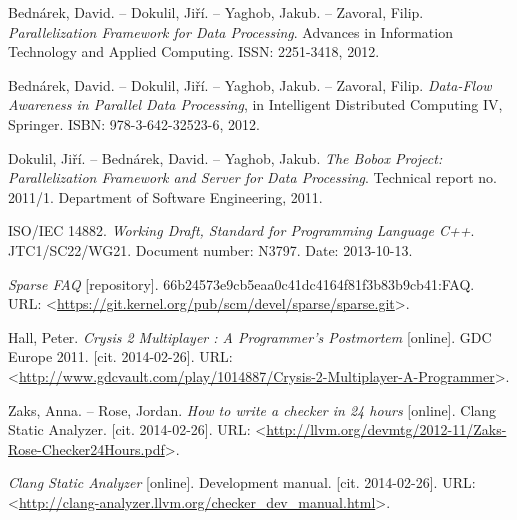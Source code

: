 
\def\bibname{Bibliography}
\begin{thebibliography}{99}
\addcontentsline{toc}{chapter}{\bibname}


	{\sc Bednárek}, David. -- {\sc Dokulil}, Jiří. -- {\sc Yaghob}, Jakub. -- {\sc Zavoral}, Filip.
	\emph{Parallelization Framework for Data Processing}.
	Advances in Information Technology and Applied Computing.
	ISSN: 2251-3418, 2012.
	
	{\sc Bednárek}, David. -- {\sc Dokulil}, Jiří. -- {\sc Yaghob}, Jakub. -- {\sc Zavoral}, Filip.
	\emph{Data-Flow Awareness in Parallel Data Processing},
	in Intelligent Distributed Computing IV, Springer.
	ISBN: 978-3-642-32523-6, 2012.

	{\sc Dokulil}, Jiří. -- {\sc Bednárek}, David. -- {\sc Yaghob}, Jakub.
	\emph{The Bobox Project: Parallelization Framework and Server for Data Processing}.
	Technical report no. 2011/1.
	Department of Software Engineering, 2011.
	
	ISO/IEC 14882.
	\emph{Working Draft, Standard for Programming Language C++}.
	JTC1/SC22/WG21.
	Document number: N3797.
	Date: 2013-10-13.
	
	\emph{Sparse FAQ} [repository].
	66b24573e9cb5eaa0c41dc4164f81f3b83b9cb41:FAQ.
	URL: <\url{https://git.kernel.org/pub/scm/devel/sparse/sparse.git}>.
	
	{\sc Hall}, Peter.
	\emph{Crysis 2 Multiplayer : A Programmer's Postmortem} [online].
	GDC Europe 2011.
	[cit. 2014-02-26].
	URL: <\url{http://www.gdcvault.com/play/1014887/Crysis-2-Multiplayer-A-Programmer}>.
	
	{\sc Zaks}, Anna. -- {\sc Rose}, Jordan.
	\emph{How to write a checker in 24 hours} [online].
	Clang Static Analyzer.
	[cit. 2014-02-26].
	URL: <\url{http://llvm.org/devmtg/2012-11/Zaks-Rose-Checker24Hours.pdf}>.
	
	\emph{Clang Static Analyzer} [online].
	Development manual.
	[cit. 2014-02-26].
	URL: <\url{http://clang-analyzer.llvm.org/checker_dev_manual.html}>.
	

\end{thebibliography}

